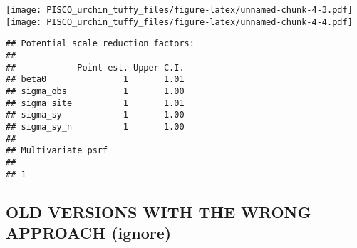 \documentclass[
]{article}
\newenvironment{Shaded}{\begin{snugshade}}{\end{snugshade}}
\newcommand{\CommentTok}[1]{\textcolor[rgb]{0.56,0.35,0.01}{\textit{#1}}}
\newcommand{\FunctionTok}[1]{\textcolor[rgb]{0.13,0.29,0.53}{\textbf{#1}}}
\newcommand{\NormalTok}[1]{#1}
\newcommand{\SpecialCharTok}[1]{\textcolor[rgb]{0.81,0.36,0.00}{\textbf{#1}}}
\begin{document}
\texttt{[image: PISCO\_urchin\_tuffy\_files/figure-latex/unnamed-chunk-4-3.pdf]}
\texttt{[image: PISCO\_urchin\_tuffy\_files/figure-latex/unnamed-chunk-4-4.pdf]}

\begin{Shaded}
\end{Shaded}

\begin{verbatim}
## Potential scale reduction factors:
## 
##            Point est. Upper C.I.
## beta0               1       1.01
## sigma_obs           1       1.00
## sigma_site          1       1.01
## sigma_sy            1       1.00
## sigma_sy_n          1       1.00
## 
## Multivariate psrf
## 
## 1
\end{verbatim}

\begin{Shaded}
\end{Shaded}

\subsection{OLD VERSIONS WITH THE WRONG APPROACH
(ignore)}\label{old-versions-with-the-wrong-approach-ignore}
\end{document}
